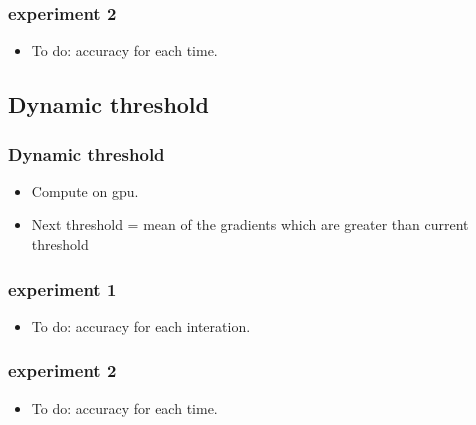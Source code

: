 \begin{frame}
    \frametitle{experiment 2}
	\begin{itemize}
		\item To do: accuracy for each time. 
	\end{itemize}
\end{frame}
\subsection{Dynamic threshold}
\begin{frame}
	\frametitle{Dynamic threshold}
	\begin{itemize}
		\item Compute on gpu. 
		\item Next threshold = mean of the gradients which are greater than current threshold
	\end{itemize}
\end{frame}
\begin{frame}
    \frametitle{experiment 1}
	\begin{itemize}
		\item To do: accuracy for each interation. 
	\end{itemize}
\end{frame}

\begin{frame}
    \frametitle{experiment 2}
	\begin{itemize}
		\item To do: accuracy for each time. 
	\end{itemize}
\end{frame}

